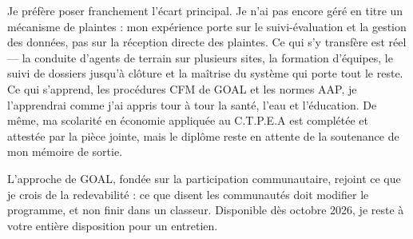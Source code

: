 \documentclass[10pt,a4paper,sans]{moderncv}
\begin{document}
Je préfère poser franchement l'écart principal. Je n'ai pas encore géré en titre un mécanisme de plaintes : mon expérience porte sur le suivi-évaluation et la gestion des données, pas sur la réception directe des plaintes. Ce qui s'y transfère est réel --- la conduite d'agents de terrain sur plusieurs sites, la formation d'équipes, le suivi de dossiers jusqu'à clôture et la maîtrise du système qui porte tout le reste. Ce qui s'apprend, les procédures CFM de GOAL et les normes AAP, je l'apprendrai comme j'ai appris tour à tour la santé, l'eau et l'éducation. De même, ma scolarité en économie appliquée au C.T.P.E.A est complétée et attestée par la pièce jointe, mais le diplôme reste en attente de la soutenance de mon mémoire de sortie.

L'approche de GOAL, fondée sur la participation communautaire, rejoint ce que je crois de la redevabilité : ce que disent les communautés doit modifier le programme, et non finir dans un classeur. Disponible dès octobre 2026, je reste à votre entière disposition pour un entretien.

\makeletterclosing
\end{document}
